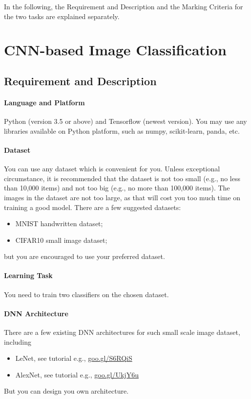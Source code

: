 \documentclass[12pt,a4]{article}
\begin{document}
In the following, the Requirement and Description and the Marking Criteria for the two tasks are explained separately. 

\section{CNN-based Image Classification}

\subsection{Requirement and Description}

\paragraph{Language and Platform} Python (version 3.5 or above) and Tensorflow (newest version). You may use any libraries available on Python platform, such as numpy, scikit-learn, panda, etc. 

\paragraph{Dataset} You can use any dataset which is convenient for you. Unless exceptional circumstance, it is recommended that the dataset is not too small (e.g., no less than 10,000 items) and not too big (e.g., no more than 100,000 items). The images in the dataset are not too large, as that will cost you too much time on training a good model. There are a few suggested datasets: 
\begin{itemize}

\item MNIST handwritten dataset; 

\item CIFAR10 small image dataset; 

\end{itemize}
%
but you are encouraged to use your preferred dataset. 

\paragraph{Learning Task}  You need to train two classifiers on the chosen dataset. 

\paragraph{DNN Architecture} There are a few existing DNN architectures for such small scale image dataset, including  
\begin{itemize}
\item LeNet, see tutorial e.g., \url{goo.gl/S6RQiS}
\item AlexNet, see tutorial e.g., \url{goo.gl/UkjY6u}
\end{itemize} 
But you can design you own architecture. 
\end{document}
